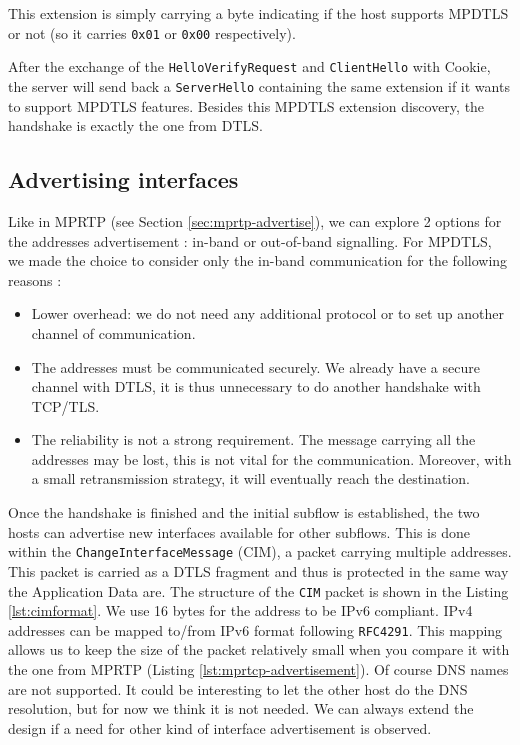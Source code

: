 This extension is simply carrying a byte indicating if the host supports MPDTLS or not (so it carries \texttt{0x01} or \texttt{0x00} respectively).

After the exchange of the \texttt{HelloVerifyRequest} and \texttt{ClientHello} with Cookie, the server will send back a \texttt{ServerHello} containing the same extension if it wants to support MPDTLS features. Besides this MPDTLS extension discovery, the handshake is exactly the one from DTLS.

\subsection{Advertising interfaces}
\label{sec:advertise}

Like in MPRTP (see Section \ref{sec:mprtp-advertise}), we can explore 2 options for the addresses advertisement : in-band or out-of-band signalling. For MPDTLS, we made the choice to consider only the in-band communication for the following reasons : 

\begin{itemize}
\item Lower overhead: we do not need any additional protocol or to set up another channel of communication.
\item The addresses must be communicated securely. We already have a secure channel with DTLS, it is thus unnecessary to do another handshake with TCP/TLS.
\item The reliability is not a strong requirement. The message carrying all the addresses may be lost, this is not vital for the communication. Moreover, with a small retransmission strategy, it will eventually reach the destination.
\end{itemize}


Once the handshake is finished and the initial subflow is established, the two hosts can advertise new interfaces available for other subflows. This is done within the \texttt{ChangeInterfaceMessage} (CIM), a packet carrying multiple addresses. This packet is carried as a DTLS fragment and thus is protected in the same way the Application Data are. The structure of the \texttt{CIM} packet is shown in the Listing \ref{lst:cimformat}. We use 16 bytes for the address to be IPv6 compliant. IPv4 addresses can be mapped to/from IPv6 format following \texttt{RFC4291}\cite{rfc4291}. This mapping allows us to keep the size of the packet relatively small when you compare it with the one from MPRTP (Listing \ref{lst:mprtcp-advertisement}). Of course DNS names are not supported. It could be interesting to let the other host do the DNS resolution, but for now we think it is not needed. We can always extend the design if a need for other kind of interface advertisement is observed.

